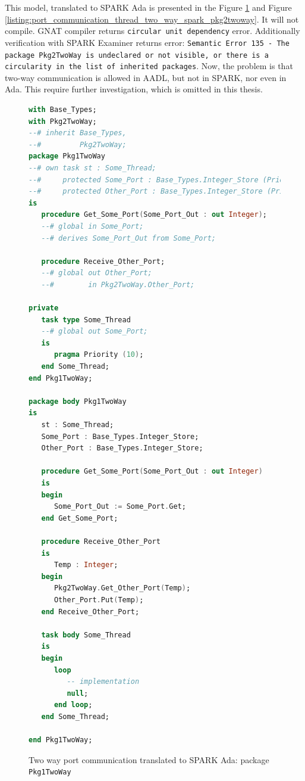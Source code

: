This model, translated to SPARK Ada is presented in the Figure \ref{listing:port_communication_thread_two_way_spark_pkg1twoway} and Figure \ref{listing:port_communication_thread_two_way_spark_pkg2twoway}. It will not compile. GNAT compiler returns \lstinline{circular unit dependency} error. Additionally verification with SPARK Examiner returns error: \lstinline{Semantic Error 135 - The package Pkg2TwoWay is undeclared or not visible, or there is a circularity in the list of inherited packages}. Now, the problem is that two-way communication is allowed in AADL, but not in SPARK, nor even in Ada. This require further investigation, which is omitted in this thesis.

\begin{figure}[ht]
\singlespacing
\begin{lstlisting}[language=ada, frame=single, gobble=0]
with Base_Types;
with Pkg2TwoWay;
--# inherit Base_Types,
--#         Pkg2TwoWay;
package Pkg1TwoWay
--# own task st : Some_Thread;
--#     protected Some_Port : Base_Types.Integer_Store (Priority => 10);
--#     protected Other_Port : Base_Types.Integer_Store (Priority => 10);
is
   procedure Get_Some_Port(Some_Port_Out : out Integer);
   --# global in Some_Port;
   --# derives Some_Port_Out from Some_Port;
   
   procedure Receive_Other_Port;
   --# global out Other_Port;
   --#        in Pkg2TwoWay.Other_Port;
   
private   
   task type Some_Thread     
   --# global out Some_Port;   
   is
      pragma Priority (10);
   end Some_Thread;
end Pkg1TwoWay;

package body Pkg1TwoWay
is
   st : Some_Thread;
   Some_Port : Base_Types.Integer_Store;
   Other_Port : Base_Types.Integer_Store;
   
   procedure Get_Some_Port(Some_Port_Out : out Integer)
   is
   begin
      Some_Port_Out := Some_Port.Get;
   end Get_Some_Port;
   
   procedure Receive_Other_Port
   is
      Temp : Integer;
   begin
      Pkg2TwoWay.Get_Other_Port(Temp);
      Other_Port.Put(Temp);
   end Receive_Other_Port;
      
   task body Some_Thread
   is   
   begin      
      loop         
         -- implementation
         null;         
      end loop;      
   end Some_Thread;

end Pkg1TwoWay;
\end{lstlisting} 
\doublespacing
\caption{Two way port communication translated to SPARK Ada: package \lstinline{Pkg1TwoWay}}
\label{listing:port_communication_thread_two_way_spark_pkg1twoway}
\end{figure}

